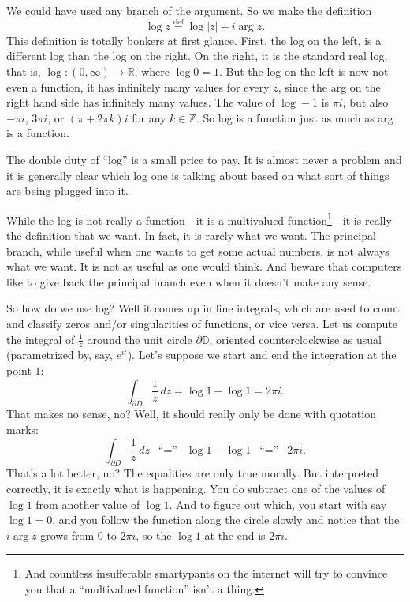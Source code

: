 \documentclass[12pt,openany]{book}
\newcommand{\sabs}[1]{\lvert {#1} \rvert}
\newcommand{\R}{{\mathbb{R}}}
\newcommand{\Z}{{\mathbb{Z}}}
\newcommand{\D}{{\mathbb{D}}}
\theoremstyle{plain}
\theoremstyle{remark}
\theoremstyle{definition}
\theoremstyle{exercise}
\theoremstyle{example}
\begin{document}
We could have used any branch of the argument.  So we 
make the definition
\begin{equation*}
\log z \overset{\text{def}}{=} \log \sabs{z} + i \arg z .
\end{equation*}
This definition is totally bonkers at first glance.  First, the log on the
left, is a different log than the log on the right.  On the right, it is the
standard real log, that is, $\log \colon (0,\infty) \to \R$,
where $\log 0 = 1$.
But the log on the left
is now not even a function, it has infinitely many values for every $z$,
since the arg on the right hand side has infinitely many values.
The value of $\log -1$ is $\pi i$, but also $-\pi i$, $3\pi i$,
or $(\pi + 2\pi k)i$ for any $k \in \Z$.  So log is a function just as much
as arg is a function.

The double duty of ``log'' is a small price to pay.  It is almost never a
problem and it is generally clear which log one is talking about based on
what sort of things are being plugged into it.

While the log is not really a function---it is a multivalued
function\footnote{%
And countless insufferable smartypants on the internet will try to convince
you that a ``multivalued function'' isn't a thing.}---it is really
the definition that we want.  In fact, it is rarely what we want.
The principal branch, while 
useful when one wants to get some actual numbers, is not always what we
want.  It is not as useful as one would think.
And beware that computers like to give back the principal branch even 
when it doesn't make any sense.

So how do we use log?  Well it comes up in line integrals, which are used
to count and classify zeros and/or singularities of functions, or vice
versa.  Let us compute the integral of $\frac{1}{z}$ around the unit
circle $\partial \D$, oriented counterclockwise as usual (parametrized
by, say, $e^{it}$).  Let's suppose we start and end the integration at the
point $1$:
\begin{equation*}
\int_{\partial D} \frac{1}{z} \, dz
= \log 1 - \log 1 = 2\pi i.
\end{equation*}
That makes no sense, no?  Well, it should really only be done
with quotation marks:
\begin{equation*}
\int_{\partial D} \frac{1}{z} \, dz
\enspace
\text{``$=$''}
\enspace
\log 1 - \log 1
\enspace
\text{``$=$''}
\enspace
2\pi i.
\end{equation*}
That's a lot better, no?  The equalities are only true morally.  But
interpreted correctly, it is exactly what is happening.  You do subtract
one of the values of $\log 1$ from another value of $\log 1$.  And to figure
out which, you start with say $\log 1 = 0$, and you follow the function
along the circle slowly and notice that the $i \arg z$ grows from $0$ to
$2\pi i$, so the $\log 1$ at the end is $2 \pi i$.
\end{document}
